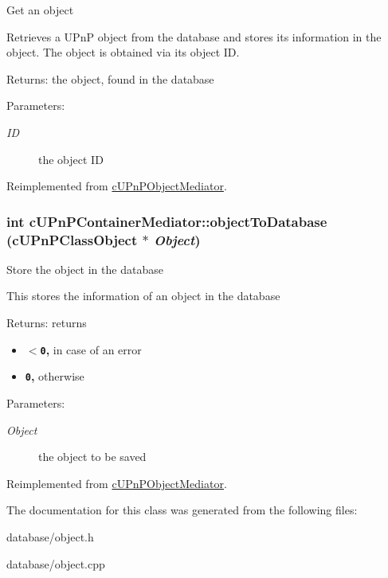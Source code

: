 Get an object

Retrieves a UPnP object from the database and stores its information in the object. The object is obtained via its object ID.

\begin{Desc}
\item[Returns:]the object, found in the database \end{Desc}
\begin{Desc}
\item[Parameters:]
\begin{description}
\item[{\em ID}]the object ID \end{description}
\end{Desc}
 

Reimplemented from \hyperlink{classcUPnPObjectMediator_5b4fff612476fb51690919f9c59899a5}{cUPnPObjectMediator}.\hypertarget{classcUPnPContainerMediator_1caa4625fca42940ba36999a71ac49ec}{
\subsubsection[{objectToDatabase}]{\setlength{\rightskip}{0pt plus 5cm}int cUPnPContainerMediator::objectToDatabase ({\bf cUPnPClassObject} $\ast$ {\em Object})}}
\label{classcUPnPContainerMediator_1caa4625fca42940ba36999a71ac49ec}


Store the object in the database

This stores the information of an object in the database

\begin{Desc}
\item[Returns:]returns\begin{itemize}
\item {\bf {\tt $<$0},} in case of an error\item {\bf {\tt 0},} otherwise \end{itemize}
\end{Desc}
\begin{Desc}
\item[Parameters:]
\begin{description}
\item[{\em Object}]the object to be saved \end{description}
\end{Desc}


Reimplemented from \hyperlink{classcUPnPObjectMediator_c44c010895f92adc63af2a2d34cf34c8}{cUPnPObjectMediator}.

The documentation for this class was generated from the following files:\begin{CompactItemize}
\item 
database/object.h\item 
database/object.cpp\end{CompactItemize}
